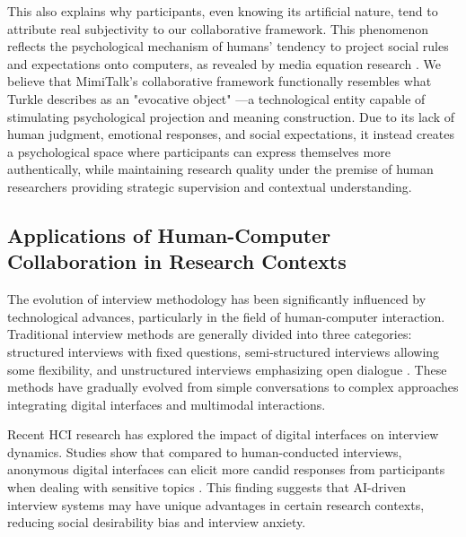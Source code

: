 \documentclass[sigchi,nonacm,manuscript]{acmart}
\begin{document}
This also explains why participants, even knowing its artificial nature, tend to attribute real subjectivity to our collaborative framework. This phenomenon reflects the psychological mechanism of humans' tendency to project social rules and expectations onto computers, as revealed by media equation research \citep{nassMachinesMindlessnessSocial2000}. We believe that MimiTalk's collaborative framework functionally resembles what Turkle describes as an "evocative object" \citep{turkleAloneTogetherWhy2011}—a technological entity capable of stimulating psychological projection and meaning construction. Due to its lack of human judgment, emotional responses, and social expectations, it instead creates a psychological space where participants can express themselves more authentically, while maintaining research quality under the premise of human researchers providing strategic supervision and contextual understanding.

\subsection{Applications of Human-Computer Collaboration in Research Contexts}

The evolution of interview methodology has been significantly influenced by technological advances, particularly in the field of human-computer interaction. Traditional interview methods are generally divided into three categories: structured interviews with fixed questions, semi-structured interviews allowing some flexibility, and unstructured interviews emphasizing open dialogue \citep{cuevas2024}. These methods have gradually evolved from simple conversations to complex approaches integrating digital interfaces and multimodal interactions.

Recent HCI research has explored the impact of digital interfaces on interview dynamics. Studies show that compared to human-conducted interviews, anonymous digital interfaces can elicit more candid responses from participants when dealing with sensitive topics \citep{pichardRoster2020}. This finding suggests that AI-driven interview systems may have unique advantages in certain research contexts, reducing social desirability bias and interview anxiety.
\end{document}
